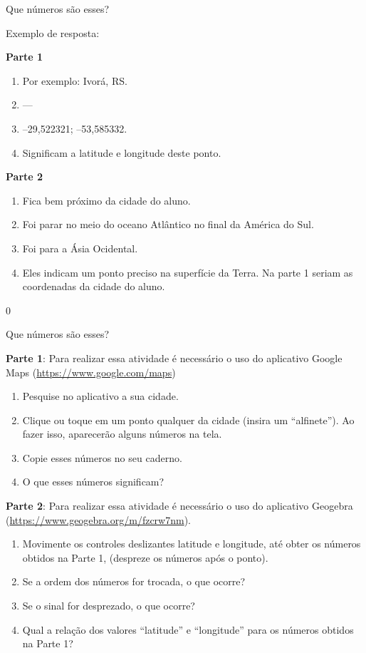 \begin{answer}{Que números são esses?}
{Exemplo de resposta:

  \textbf{Parte 1}
  \begin{enumerate}
  \item Por exemplo: Ivorá, RS.
  \item ---
  \item --29{,}522321; --53,585332.
  \item Significam a latitude e longitude deste ponto.
  \end{enumerate}
\vspace{\baselineskip}
  \textbf{Parte 2}
  \begin{enumerate}
  \item Fica bem próximo da  cidade do aluno.
  \item Foi parar no meio do oceano Atlântico no final da América do Sul.
  \item Foi para a Ásia Ocidental.
  \item Eles indicam um ponto preciso na superfície da Terra. Na parte 1 seriam as coordenadas da  cidade do aluno.
  \end{enumerate}
}{0}
\end{answer}

\label{coord_geo}



\begin{task}{Que números são esses?}

\textbf{Parte 1}: Para realizar essa atividade é necessário o uso do aplicativo Google Maps (\url{https://www.google.com/maps})
\begin{enumerate}
\item Pesquise no aplicativo a sua cidade.
\item Clique ou toque em um ponto qualquer da cidade (insira um “alfinete”). Ao fazer isso, aparecerão alguns números na tela.
\item Copie esses números no seu caderno.
\item O que esses números significam?
\end{enumerate}

\textbf{Parte 2}: Para realizar essa atividade é necessário o uso do aplicativo Geogebra (\url{https://www.geogebra.org/m/fzcrw7nm}).
\begin{enumerate}
\item Movimente os controles deslizantes latitude e longitude, até obter os números obtidos na Parte 1, (despreze os números após o ponto).
\item Se a ordem dos números for trocada, o que ocorre?
\item Se o sinal for desprezado, o que ocorre?
\item Qual a relação dos valores “latitude” e “longitude” para os números obtidos na Parte 1?
\end{enumerate}

\end{task}


